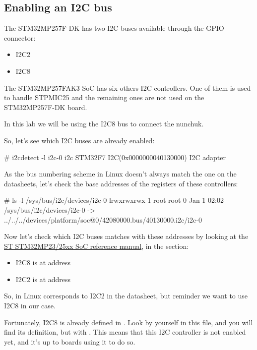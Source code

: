 \subsection{Enabling an I2C bus}

The STM32MP257F-DK has two I2C buses available through the GPIO connector:

\begin{itemize}
\item I2C2
\item I2C8
\end{itemize}

The STM32MP257FAK3 SoC has six others I2C controllers.
One of them is used to handle STPMIC25 and the remaining ones are not used on the
STM32MP257F-DK board.

In this lab we will be using the I2C8 bus to connect the nunchuk.

So, let's see which I2C buses are already enabled:

\begin{bashinput}
# i2cdetect -l
i2c-0	i2c       	STM32F7 I2C(0x0000000040130000) 	I2C adapter
\end{bashinput}

As the bus numbering scheme in Linux doesn't always match the one
on the datasheets, let's check the base addresses of the registers
of these controllers:

\begin{bashinput}
# ls -l /sys/bus/i2c/devices/i2c-0
lrwxrwxrwx    1 root     root             0 Jan  1 02:02 /sys/bus/i2c/devices/i2c-0 -> ../../../devices/platform/soc@0/42080000.bus/40130000.i2c/i2c-0
\end{bashinput}

Now let's check which I2C buses matches with these addresses by looking at the
\href{https://www.st.com/resource/en/reference_manual/rm0457-stm32mp2325xx-advanced-armbased-3264bit-mpus-stmicroelectronics.pdf}{ST STM32MP23/25xx SoC reference manual},
in the  section:

\begin{itemize}
\item I2C8 is at address 
\item I2C2 is at address 
\end{itemize}

So,  in Linux corresponds to I2C2 in the datasheet,
but reminder we want to use I2C8 in our case.

Fortunately, I2C8 is already defined in 
.
Look by yourself in this file, and you will find its definition,
but with .
This means that this I2C controller is not enabled yet,
and it's up to boards using it to do so.

